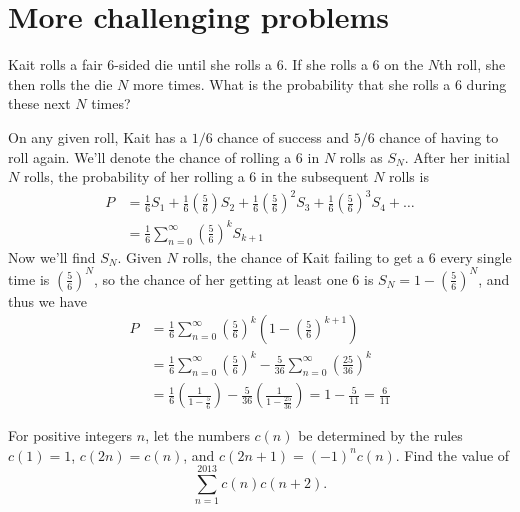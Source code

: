\newpage
\section{More challenging problems}

\begin{problem}
    Kait rolls a fair 6-sided die until she rolls a 6. If she rolls a 6 on the $N$th roll, she then rolls the die $N$ more times. What is the probability that she rolls a 6 during these next $N$ times?
\end{problem}

\begin{solution}
    On any given roll, Kait has a $1/6$ chance of success and $5/6$ chance of having to roll again. We'll denote the chance of rolling a 6 in $N$ rolls as $S_N$. After her initial $N$ rolls, the probability of her rolling a 6 in the subsequent $N$ rolls is
    \begin{align*}
        P &= \frac{1}{6}S_1 + \frac{1}{6} \left(\frac{5}{6}\right) S_2 + \frac{1}{6} \left(\frac{5}{6}\right)^{\!\!2}S_3 + \frac{1}{6} \left(\frac{5}{6}\right)^{\!\!3}S_4 + \dots\\
        &= \frac{1}{6}\sum_{n=0}^\infty \left(\frac{5}{6}\right)^{\!\!k}S_{k+1}
    \end{align*}
    Now we'll find $S_N$. Given $N$ rolls, the chance of Kait failing to get a 6 every single time is $\left(\frac{5}{6}\right)^N$, so the chance of her getting at least one 6 is $S_N=1-\left(\frac{5}{6}\right)^N$, and thus we have
    \begin{align*}
        P &= \frac{1}{6}\sum_{n=0}^\infty \left(\frac{5}{6}\right)^{\!\!k}\left(1-\left(\frac{5}{6}\right)^{\!\!{k+1}}\right)\\
        &= \frac{1}{6}\sum_{n=0}^\infty \left(\frac{5}{6}\right)^{\!\!k} - \frac{5}{36}\sum_{n=0}^\infty \left(\frac{25}{36}\right)^{\!\!k}\\
        &= \frac{1}{6}\left(\frac{1}{1-\tfrac{5}{6}}\right) - \frac{5}{36}\left(\frac{1}{1-\tfrac{25}{36}}\right) = 1 - \frac{5}{11} = \boxed{\frac{6}{11}}
    \end{align*}
\end{solution}

\begin{problem}[B][4][Putnam 2013 B1]
    For positive integers \( n \), let the numbers \( c(n) \) be determined by the rules \( c(1) = 1 \), \( c(2n) = c(n) \), and \( c(2n+1) = (-1)^n c(n) \). Find the value of
    \[
    \sum_{n=1}^{2013} c(n)c(n+2).
    \]
\end{problem}

